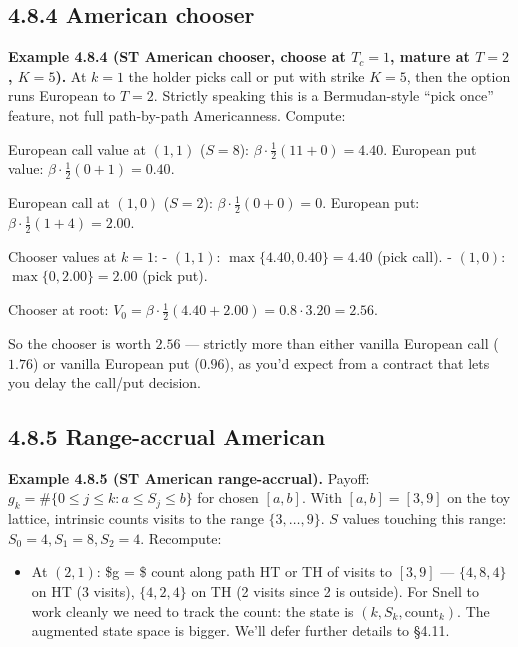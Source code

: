 \documentclass[
  10pt,
  twoside]{book}
\providecommand{\tightlist}{%
  \setlength{\itemsep}{0pt}\setlength{\parskip}{0pt}}
\begin{document}
\subsection{4.8.4 American chooser}\label{american-chooser}

\textbf{Example 4.8.4 (ST American chooser, choose at \(T_c = 1\),
mature at \(T = 2\), \(K = 5\)).} At \(k = 1\) the holder picks call or
put with strike \(K = 5\), then the option runs European to \(T = 2\).
Strictly speaking this is a Bermudan-style ``pick once'' feature, not
full path-by-path Americanness. Compute:

European call value at \((1, 1)\) (\(S = 8\)):
\(\beta\cdot\tfrac{1}{2}(11 + 0) = 4.40\). European put value:
\(\beta\cdot\tfrac{1}{2}(0 + 1) = 0.40\).

European call at \((1, 0)\) (\(S = 2\)):
\(\beta\cdot\tfrac{1}{2}(0 + 0) = 0\). European put:
\(\beta\cdot\tfrac{1}{2}(1 + 4) = 2.00\).

Chooser values at \(k = 1\): - \((1, 1)\): \(\max\{4.40, 0.40\} = 4.40\)
(pick call). - \((1, 0)\): \(\max\{0, 2.00\} = 2.00\) (pick put).

Chooser at root:
\(V_0 = \beta\cdot\tfrac{1}{2}(4.40 + 2.00) = 0.8\cdot 3.20 = 2.56\).

So the chooser is worth \(2.56\) --- strictly more than either vanilla
European call (\(1.76\)) or vanilla European put (\(0.96\)), as you'd
expect from a contract that lets you delay the call/put decision.

\subsection{4.8.5 Range-accrual American}\label{range-accrual-american}

\textbf{Example 4.8.5 (ST American range-accrual).} Payoff:
\(g_k = \#\{0 \le j \le k : a \le S_j \le b\}\) for chosen \([a, b]\).
With \([a, b] = [3, 9]\) on the toy lattice, intrinsic counts visits to
the range \(\{3, \dots, 9\}\). \(S\) values touching this range:
\(S_0 = 4, S_1 = 8, S_2 = 4\). Recompute:

\begin{itemize}
\tightlist
\item
  At \((2, 1)\): \$g = \$ count along path HT or TH of visits to
  \([3, 9]\) --- \(\{4, 8, 4\}\) on HT (3 visits), \(\{4, 2, 4\}\) on TH
  (2 visits since 2 is outside). For Snell to work cleanly we need to
  track the count: the state is \((k, S_k, \text{count}_k)\). The
  augmented state space is bigger. We'll defer further details to §4.11.
\end{itemize}
\end{document}

